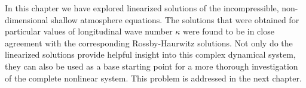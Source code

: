 In this chapter we have explored linearized solutions of the incompressible, non-dimensional shallow atmosphere equations. The solutions that were obtained for particular values of longitudinal wave number $\kappa$ were found to be in close agreement with the corresponding Rossby-Haurwitz solutions. Not only do the linearized solutions provide helpful insight into this complex dynamical system, they can also be used as a base starting point for a more thorough investigation of the complete nonlinear system. This problem is addressed in the next chapter.

